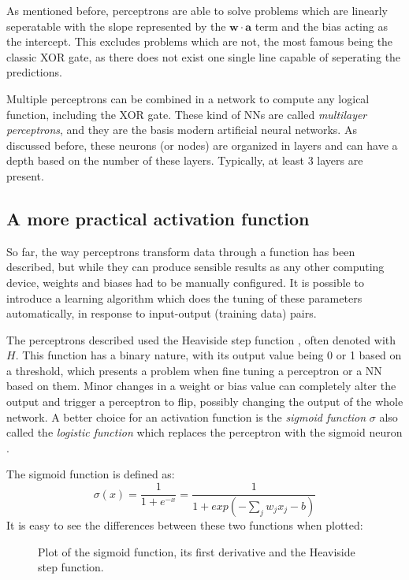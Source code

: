 \begin{remark}
  As mentioned before, perceptrons are able to solve problems
  which are linearly seperatable with the slope represented
  by the $\bm{w} \cdot \bm{a}$ term and the bias acting as
  the intercept. 
  This excludes problems which are not, the most famous being
  the classic XOR gate, as there does not exist one single
  line capable of seperating the predictions.
\end{remark}

Multiple perceptrons can be combined in a network to compute any
logical function, including the XOR gate. These kind of NNs are called
\textit{multilayer perceptrons}, and they are the basis modern
artificial neural networks. As discussed before, these neurons (or
nodes) are organized in layers and can have a depth based on the
number of these layers. Typically, at least 3 layers are present.

\subsection*{A more practical activation function}

So far, the way perceptrons transform data through a function
has been described, but while they can produce
sensible results as any other computing device, weights and
biases had to be manually configured. It is possible to introduce
a learning algorithm which does the tuning of these parameters
automatically, in response to input-output (training data) pairs.

The perceptrons described used the Heaviside step function
\cite{book:Abramowitz}, often denoted with $\textit{H}$. This function
has a binary nature, with its output value being 0 or 1 based on a
threshold, which presents a problem when fine tuning a perceptron or a
NN based on them. Minor changes in a weight or bias value can
completely alter the output and trigger a perceptron to flip, possibly
changing the output of the whole network. A better choice for an
activation function is the \textit{sigmoid function} $\sigma$ also
called the \textit{logistic function} which replaces the perceptron
with the sigmoid neuron \cite{book:nielsen}.

The sigmoid function is defined as:
\begin{equation}
    \sigma (x) = \frac{1}{1 + e^{-x}} = \frac{1}{1 + exp(-\sum_jw_jx_j-b)}
    \label{eq:sigmoid}
\end{equation}
It is easy to see the differences between these two functions when
plotted:
\begin{figure}[h]
  \centering
      \scalebox{1}{}
      \label{fig:sigmoid function and its derivative}
      \caption{Plot of the sigmoid function, its first derivative and
        the Heaviside step function.}
\end{figure}

